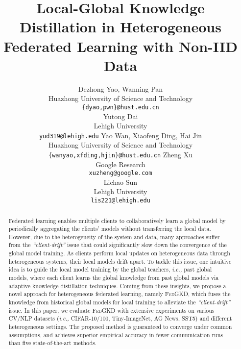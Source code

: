 \documentclass{article} %
\title{Local-Global Knowledge Distillation in Heterogeneous Federated Learning with Non-IID Data}
\author{Dezhong Yao, Wanning Pan \\
Huazhong University of Science and Technology \\
\texttt{\{dyao,pwn\}@hust.edu.cn} \\
\And
Yutong Dai\\
Lehigh University \\
\texttt{yud319@lehigh.edu}
\And
Yao Wan, Xiaofeng Ding, Hai Jin\\
Huazhong University of Science and Technology \\
\texttt{\{wanyao,xfding,hjin\}@hust.edu.cn}
\And
Zheng Xu \\
Google Research \\
\texttt{xuzheng@google.com} \\
\And
Lichao Sun \\
Lehigh University \\
\texttt{lis221@lehigh.edu}
}
\newcommand{\system}{\textsc{FedGKD}\xspace}
\begin{document}
\maketitle

\begin{abstract}
Federated learning enables multiple clients to collaboratively learn a global model by periodically aggregating the clients' models without transferring the local data. However, due to the heterogeneity of the system and data, many approaches suffer from the {\em ``client-drift''} issue that could significantly slow down the convergence of the global model training. As clients perform local updates on heterogeneous data through heterogeneous systems, their local models drift apart. To tackle this issue, one intuitive idea is to guide the local model training by the global teachers, {\em i.e.,} past global models, where each client learns the global knowledge from past global models via adaptive knowledge distillation techniques. Coming from these insights, we propose a novel approach for heterogeneous federated learning, namely \system, which fuses the knowledge from historical global models for local training to alleviate the {\em ``client-drift''} issue. In this paper, we evaluate \system with extensive experiments on various CV/NLP datasets ({\em i.e.,} CIFAR-10/100, Tiny-ImageNet, AG News, SST5) and different heterogeneous settings. The proposed method is guaranteed to converge under common assumptions, and achieves superior empirical accuracy  in fewer communication runs than five state-of-the-art methods.

\end{abstract}
\end{document}
